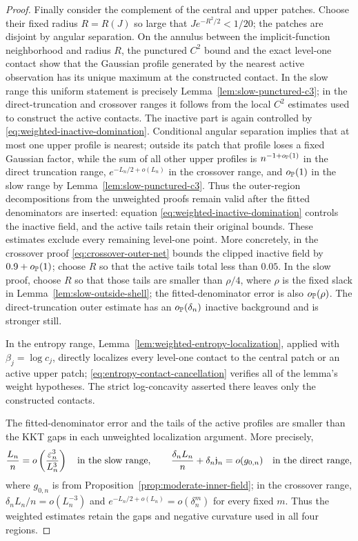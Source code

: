 \begin{proof}
Finally consider the complement of the central and upper patches.
Choose their fixed radius \(R=R(J)\) so large that
\(Je^{-R^2/2}<1/20\); the patches are disjoint by angular separation.
On the annulus between the implicit-function neighborhood and radius
\(R\), the punctured \(C^2\) bound and the exact level-one contact show
that the Gaussian profile generated by the nearest active observation has
its unique maximum at the constructed contact.  In the slow range this
uniform statement is precisely Lemma~\ref{lem:slow-punctured-c3}; in the
direct-truncation and crossover ranges it follows from the local \(C^2\)
estimates used to construct the active contacts.
The inactive part is again controlled by
\eqref{eq:weighted-inactive-domination}.  Conditional angular separation
implies that at most one upper profile is nearest; outside its patch that
profile loses a fixed Gaussian factor, while the sum of all other upper
profiles is \(n^{-1+o_{\mathbb P}(1)}\) in the direct truncation range,
\(e^{-L_n/2+o(L_n)}\) in the crossover range, and \(o_{\mathbb P}(1)\) in the
slow range by Lemma~\ref{lem:slow-punctured-c3}.  Thus the outer-region
decompositions from the unweighted proofs remain valid after the fitted
denominators are inserted: equation
\eqref{eq:weighted-inactive-domination} controls the inactive field, and
the active tails retain their original bounds.  These estimates exclude
every remaining level-one point.
More concretely, in the crossover proof
\eqref{eq:crossover-outer-net} bounds the clipped inactive field by
\(0.9+o_{\mathbb P}(1)\); choose \(R\) so that the active tails total less
than \(0.05\).  In the slow proof, choose \(R\) so that those tails are
smaller than \(\rho/4\), where \(\rho\) is the fixed slack in
Lemma~\ref{lem:slow-outside-shell}; the fitted-denominator error is also
\(o_{\mathbb P}(\rho)\). The direct-truncation outer estimate has
an \(o_{\mathbb P}(\delta_n)\) inactive background and is stronger still.

In the entropy range,
Lemma~\ref{lem:weighted-entropy-localization}, applied with
\(\beta_j=\log c_j\), directly localizes every level-one contact to the
central patch or an active upper patch;
\eqref{eq:entropy-contact-cancellation} verifies all of the lemma's weight
hypotheses.  The strict log-concavity asserted there leaves only the
constructed contacts.

The fitted-denominator error and the tails of the active profiles are
smaller than the KKT gaps in each unweighted localization argument.  More
precisely,
\[
 \frac{L_n}{n}=o\left(\frac{\varepsilon_n^3}{L_n^3}\right)
 \quad\text{in the slow range},\qquad
 \frac{\delta_nL_n}{n}+\delta_n\mathfrak j_n=o(g_{0,n})
 \quad\text{in the direct range},
\]
where \(g_{0,n}\) is from
Proposition~\ref{prop:moderate-inner-field}; in the crossover range,
\(\delta_nL_n/n=o(L_n^{-3})\) and
\(e^{-L_n/2+o(L_n)}=o(\delta_n^m)\) for every fixed \(m\).
Thus the weighted estimates retain the gaps and negative curvature used in
all four regions.


\end{proof}

